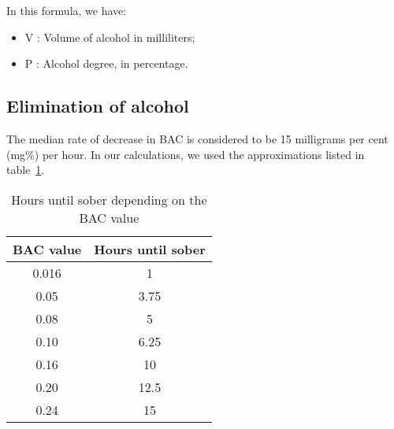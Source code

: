 In this formula, we have:

\begin{itemize}
\item V : Volume of alcohol in milliliters;
\item P : Alcohol degree, in percentage.
\end{itemize}

\subsection{Elimination of alcohol}
\label{ssec:elim}

The median rate of decrease in BAC is considered to be 15 milligrams per cent (mg\%) per hour. In our calculations, we used the approximations listed in {\sc table}~\ref{tab:elim}.

\begin{table}[H]
\centering
\begin{tabular}{|c|c|}
  \hline
  \bf{BAC value} & \bf{Hours until sober}\\
  \hline
	0.016 & 1\\
	0.05 & 3.75\\
	0.08 & 5\\
	0.10 & 6.25\\
	0.16 & 10\\
	0.20 & 12.5\\
	0.24 & 15\\
  \hline
\end{tabular}
\caption{Hours until sober depending on the BAC value}
\label{tab:elim}
\end{table}